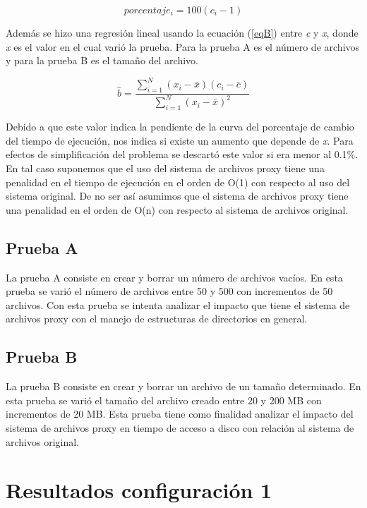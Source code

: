 \begin{equation}
\label{eqP}
porcentaje_{i} = 100(c_{i} - 1)
\end{equation}

Además se hizo una regresión lineal usando la ecuación (\ref{eqB}) entre \textit{c} y \textit{x}, donde \textit{x} es el valor en el cual varió la prueba. Para la prueba A es el número de archivos y para la prueba B es el tamaño del archivo.

\begin{equation}
\label{eqB}
\hat{b} = \frac {\sum_{i=1}^{N}  (x_{i} - \bar{x})(c_{i} - \bar{c}) }  {\sum_{i=1}^{N} (x_{i} - \bar{x}) ^2}
\end{equation}

Debido a que este valor indica la pendiente de la curva del porcentaje de cambio del tiempo de ejecución, nos indica si existe un aumento que depende de \textit{x}. Para efectos de simplificación del problema se descartó este valor si era menor al 0.1\%. En tal caso suponemos que el uso del sistema de archivos proxy tiene una penalidad en el tiempo de ejecución en el orden de O(1) con respecto al uso del sistema original. De no ser así asumimos que el sistema de archivos proxy tiene una penalidad en el orden de O(n) con respecto al sistema de archivos original.

\subsection{Prueba A}

La prueba A consiste en crear y borrar un número de archivos vacíos. En esta prueba se varió el número de archivos entre 50 y 500 con incrementos de 50 archivos. Con esta prueba se intenta analizar el impacto que tiene el sistema de archivos proxy con el manejo de estructuras de directorios en general.

\subsection{Prueba B}

La prueba B consiste en crear y borrar un archivo de un tamaño determinado. En esta prueba se varió el tamaño del archivo creado entre 20 y 200 MB con incrementos de 20 MB. Esta prueba tiene como finalidad analizar el impacto del sistema de archivos proxy en tiempo de acceso a disco con relación al sistema de archivos original.


\section{Resultados configuración 1}

